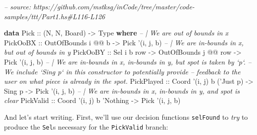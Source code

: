 \documentclass[]{article}
\newenvironment{Shaded}{}{}
\newcommand{\CommentTok}[1]{\textcolor[rgb]{0.38,0.63,0.69}{\textit{#1}}}
\newcommand{\DataTypeTok}[1]{\textcolor[rgb]{0.56,0.13,0.00}{#1}}
\newcommand{\FunctionTok}[1]{\textcolor[rgb]{0.02,0.16,0.49}{#1}}
\newcommand{\KeywordTok}[1]{\textcolor[rgb]{0.00,0.44,0.13}{\textbf{#1}}}
\newcommand{\NormalTok}[1]{#1}
\newcommand{\OtherTok}[1]{\textcolor[rgb]{0.00,0.44,0.13}{#1}}
\begin{document}
\begin{Shaded}
\begin{Highlighting}[]
\CommentTok{-- source: https://github.com/mstksg/inCode/tree/master/code-samples/ttt/Part1.hs#L116-L126}

\KeywordTok{data} \DataTypeTok{Pick}\OtherTok{ ::}\NormalTok{ (}\DataTypeTok{N}\NormalTok{, }\DataTypeTok{N}\NormalTok{, }\DataTypeTok{Board}\NormalTok{) }\OtherTok{->} \DataTypeTok{Type} \KeywordTok{where}
    \CommentTok{-- | We are out of bounds in x}
    \DataTypeTok{PickOoBX}\OtherTok{   ::} \DataTypeTok{OutOfBounds}\NormalTok{ i }\FunctionTok{@@}\NormalTok{ b                         }\OtherTok{->} \DataTypeTok{Pick}\NormalTok{ '(i, j, b)}
    \CommentTok{-- | We are in-bounds in x, but out of bounds in y}
    \DataTypeTok{PickOoBY}\OtherTok{   ::} \DataTypeTok{Sel}\NormalTok{ i b row        }\OtherTok{->} \DataTypeTok{OutOfBounds}\NormalTok{ j }\FunctionTok{@@}\NormalTok{ row }\OtherTok{->} \DataTypeTok{Pick}\NormalTok{ '(i, j, b)}
    \CommentTok{-- | We are in-bounds in x, in-bounds in y, but spot is taken by `p`.}
    \CommentTok{-- We include `Sing p` in this constructor to potentially provide}
    \CommentTok{-- feedback to the user on what piece is already in the spot.}
    \DataTypeTok{PickPlayed}\OtherTok{ ::} \DataTypeTok{Coord}\NormalTok{ '(i, j) b ('}\DataTypeTok{Just}\NormalTok{ p) }\OtherTok{->} \DataTypeTok{Sing}\NormalTok{ p        }\OtherTok{->} \DataTypeTok{Pick}\NormalTok{ '(i, j, b)}
    \CommentTok{-- | We are in-bounds in x, in-bounds in y, and spot is clear}
    \DataTypeTok{PickValid}\OtherTok{  ::} \DataTypeTok{Coord}\NormalTok{ '(i, j) b '}\DataTypeTok{Nothing}                   \OtherTok{->} \DataTypeTok{Pick}\NormalTok{ '(i, j, b)}
\end{Highlighting}
\end{Shaded}

And let's start writing. First, we'll use our decision functions
\texttt{selFound} to \emph{try} to produce the \texttt{Sel}s necessary for the
\texttt{PickValid} branch:

\begin{Shaded}
\end{Shaded}
\end{document}

